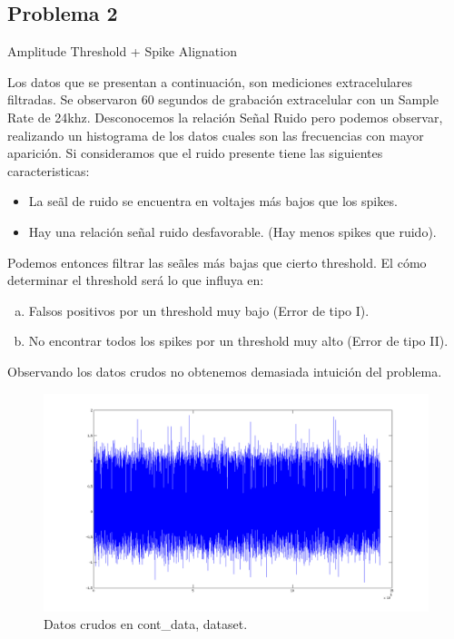 \documentclass[a4paper,spanish]{article}
\begin{document}



\subsection{Problema 2}

Amplitude Threshold + Spike Alignation

Los datos que se presentan a continuaci\'on, son mediciones extracelulares filtradas. Se observaron 60 segundos de grabaci\'on extracelular con un Sample Rate de 24khz.
Desconocemos la relaci\'on Se\~nal Ruido pero podemos observar, realizando un histograma de los datos cuales son las frecuencias con mayor aparici\'on. Si consideramos que el ruido presente tiene las siguientes caracteristicas:

\begin{itemize}
	\item La se\~al de ruido se encuentra en voltajes m\'as bajos que los spikes.
	\item Hay una relaci\'on se\~nal ruido desfavorable. (Hay menos spikes que ruido).
\end{itemize}

Podemos entonces filtrar las se\~ales m\'as bajas que cierto threshold. El c\'omo determinar el threshold ser\'a lo que influya en:

\begin{enumerate}[a.]
	\item Falsos positivos por un threshold muy bajo (Error de tipo I).
	\item No encontrar todos los spikes  por un threshold muy alto (Error de tipo II).
\end{enumerate}


Observando los datos crudos no obtenemos demasiada intuici\'on del problema.

\begin{figure}[htc]
	\centering
	\includegraphics[width=1.0\textwidth]{imgs/raw_cont_data.png}
	\caption{Datos crudos en cont\_data, dataset.}
	\label{fig3}
\end{figure}
\end{document}
